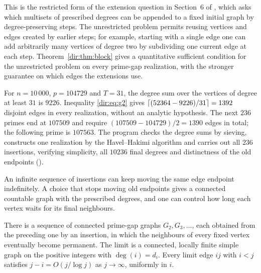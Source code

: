 This is the restricted form of the extension question in Section~6 of
\cite{ErdosKharelMezeiToroczkai2023Degree}, which asks which multisets of prescribed
degrees can be appended to a fixed initial graph by degree-preserving steps. The
unrestricted problem permits reusing vertices and edges created by earlier steps; for
example, starting with a single edge one can add arbitrarily many vertices of degree
two by subdividing one current edge at each step. Theorem~\ref{dir:thm:block} gives a
quantitative sufficient condition for the unrestricted problem on every prime-gap
realization, with the stronger guarantee on which edges the extensions use.

\begin{example}[\stU]\label{dir:ex:graph}
For $n=10\,000$, $p=104729$ and $T=31$, the degree sum over the vertices of degree at
least $31$ is $9226$. Inequality \eqref{dir:eq:g2} gives
$\lceil(52364-9226)/31\rceil=1392$ disjoint edges in every realization, without an analytic
hypothesis. The next $236$ primes end at $107509$ and require
$(107509-104729)/2=1390$ edges in total; the following prime is $107563$. The program
 checks the degree
sums by sieving, constructs one realization by the Havel--Hakimi algorithm and carries
out all $236$ insertions, verifying simplicity, all $10236$ final degrees and
distinctness of the old endpoints
().
\end{example}

An infinite sequence of insertions can keep moving the same edge endpoint
indefinitely. A choice that stops moving old endpoints gives a connected countable
graph with the prescribed degrees, and one can control how long each vertex waits for
its final neighbours.

\begin{theorem}\label{dir:thm:stabilize}
There is a sequence of connected prime-gap graphs $G_2,G_3,\dots$, each obtained from
the preceding one by an insertion, in which the neighbours of every fixed vertex
eventually become permanent. The limit is a connected, locally finite simple graph on
the positive integers with $\deg(i)=d_i$. Every limit edge $ij$ with $i<j$ satisfies
$j-i=O(j/\log j)$ as $j\to\infty$, uniformly in $i$.
\end{theorem}

